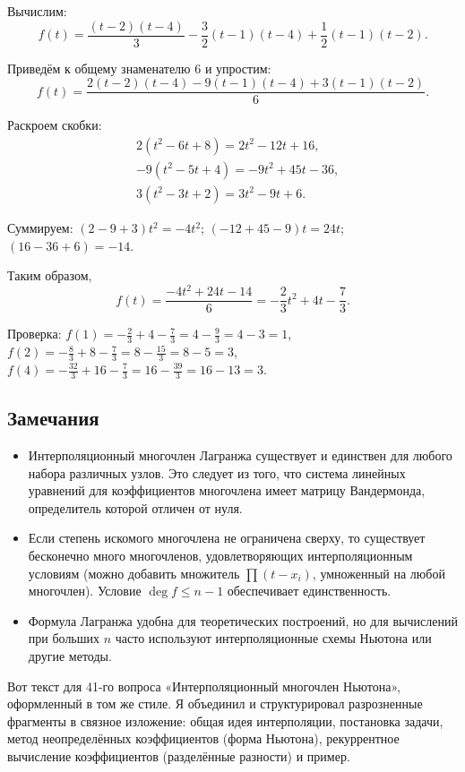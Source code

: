 \documentclass[a4paper,12pt]{article}
\theoremstyle{definition}
\theoremstyle{plain}
\theoremstyle{remark}
\begin{document}
	Вычислим:
	\[
	f(t) = \frac{(t-2)(t-4)}{3} - \frac{3}{2}(t-1)(t-4) + \frac{1}{2}(t-1)(t-2).
	\]
	
	Приведём к общему знаменателю 6 и упростим:
	\[
	f(t) = \frac{2(t-2)(t-4) - 9(t-1)(t-4) + 3(t-1)(t-2)}{6}.
	\]
	
	Раскроем скобки:
	\[
	\begin{aligned}
		& 2(t^2 - 6t + 8) = 2t^2 - 12t + 16, \\
		& -9(t^2 - 5t + 4) = -9t^2 + 45t - 36, \\
		& 3(t^2 - 3t + 2) = 3t^2 - 9t + 6.
	\end{aligned}
	\]
	
	Суммируем: \( (2 - 9 + 3)t^2 = -4t^2 \); \( (-12 + 45 - 9)t = 24t \); \( (16 - 36 + 6) = -14 \).
	
	Таким образом,
	\[
	f(t) = \frac{-4t^2 + 24t - 14}{6} = -\frac{2}{3}t^2 + 4t - \frac{7}{3}.
	\]
	
	Проверка: \( f(1) = -\frac{2}{3} + 4 - \frac{7}{3} = 4 - \frac{9}{3} = 4 - 3 = 1 \), \( f(2) = -\frac{8}{3} + 8 - \frac{7}{3} = 8 - \frac{15}{3} = 8 - 5 = 3 \), \( f(4) = -\frac{32}{3} + 16 - \frac{7}{3} = 16 - \frac{39}{3} = 16 - 13 = 3 \).
	
	\subsection{Замечания}
	
	\begin{itemize}
		\item Интерполяционный многочлен Лагранжа существует и единствен для любого набора различных узлов. Это следует из того, что система линейных уравнений для коэффициентов многочлена имеет матрицу Вандермонда, определитель которой отличен от нуля.
		\item Если степень искомого многочлена не ограничена сверху, то существует бесконечно много многочленов, удовлетворяющих интерполяционным условиям (можно добавить множитель \( \prod (t - x_i) \), умноженный на любой многочлен). Условие \( \deg f \leq n-1 \) обеспечивает единственность.
		\item Формула Лагранжа удобна для теоретических построений, но для вычислений при больших \( n \) часто используют интерполяционные схемы Ньютона или другие методы.
	\end{itemize}
	
	
	
	
	
	
	Вот текст для 41-го вопроса «Интерполяционный многочлен Ньютона», оформленный в том же стиле. Я объединил и структурировал разрозненные фрагменты в связное изложение: общая идея интерполяции, постановка задачи, метод неопределённых коэффициентов (форма Ньютона), рекуррентное вычисление коэффициентов (разделённые разности) и пример.
	
\end{document}
